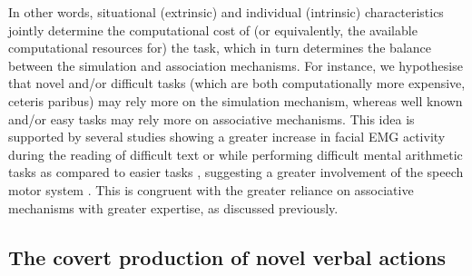 \documentclass[utf8]{template/frontiersSCNS} %
\begin{document}
In other words, situational (extrinsic) and individual (intrinsic) characteristics jointly determine the computational cost of (or equivalently, the available computational resources for) the task, which in turn determines the balance between the simulation and association mechanisms. For instance, we hypothesise that novel and/or difficult tasks (which are both computationally more expensive, ceteris paribus) may rely more on the simulation mechanism, whereas well known and/or easy tasks may rely more on associative mechanisms. This idea is supported by several studies showing a greater increase in facial EMG activity during the reading of difficult text or while performing difficult mental arithmetic tasks as compared to easier tasks \citep[e.g.,][]{faaborg-andersen_electromyography_1958, sokolov_inner_1972}, suggesting a greater involvement of the speech motor system \citep[and/or a lesser involvement of inhibitory mechanisms, see also the discussion in][]{nalborczyk_understanding_2019-1, nalborczyk_re-analysing_2020}. This is congruent with the greater reliance on associative mechanisms with greater expertise, as discussed previously. 


\subsection{The covert production of novel verbal actions}
\end{document}
